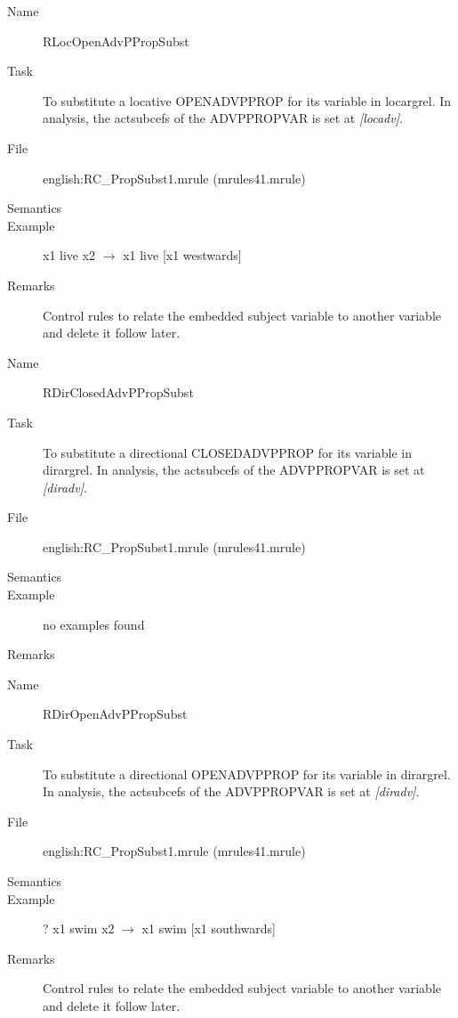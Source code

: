 \begin{description}
\vspace{1 cm}
\begin{description}
\item[Name] RLocOpenAdvPPropSubst
\item[Task] To substitute a locative OPENADVPPROP for its variable in 
locargrel. In analysis, the actsubcefs of the ADVPPROPVAR is set at 
{\em [locadv]\/}.  
\item[File] english:RC\_PropSubst1.mrule (mrules41.mrule)
\item[Semantics]
\item[Example] x1 live x2 $\rightarrow$ x1 live [x1 westwards]
\item[Remarks] Control rules to relate the embedded subject variable to 
another variable and delete it follow later.
\end{description}

\vspace{1 cm}
\begin{description}
\item[Name]   RDirClosedAdvPPropSubst
\item[Task] To substitute a directional CLOSEDADVPPROP for its variable in 
dirargrel. In analysis, the actsubcefs of the ADVPPROPVAR is set at 
{\em [diradv]\/}.
\item[File] english:RC\_PropSubst1.mrule (mrules41.mrule)
\item[Semantics]
\item[Example] no examples found
\item[Remarks]
\end{description}

\vspace{1 cm}
\begin{description}
\item[Name] RDirOpenAdvPPropSubst
\item[Task] To substitute a directional OPENADVPPROP for its variable in 
dirargrel. In analysis, the actsubcefs of the ADVPPROPVAR is set at 
{\em [diradv]\/}. 
\item[File] english:RC\_PropSubst1.mrule (mrules41.mrule)
\item[Semantics]
\item[Example] ? x1 swim x2 $\rightarrow$ x1 swim [x1 southwards]
\item[Remarks] Control rules to relate the embedded subject variable to 
another variable and delete it follow later.
\end{description}


\end{description}
